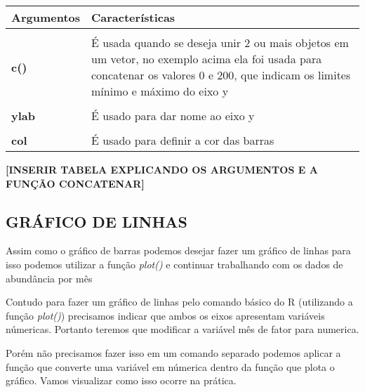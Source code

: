 \documentclass[]{book}
\newenvironment{Shaded}{\begin{snugshade}}{\end{snugshade}}
\newcommand{\DataTypeTok}[1]{\textcolor[rgb]{0.13,0.29,0.53}{#1}}
\newcommand{\KeywordTok}[1]{\textcolor[rgb]{0.13,0.29,0.53}{\textbf{#1}}}
\newcommand{\NormalTok}[1]{#1}
\newcommand{\OperatorTok}[1]{\textcolor[rgb]{0.81,0.36,0.00}{\textbf{#1}}}
\begin{document}
\begin{table}[H]
\centering
\begin{tabular}[t]{>{}l>{\raggedright\arraybackslash}p{30em}}
\toprule
Argumentos & Características\\
\midrule
\textbf{\cellcolor{gray!6}{ylim}} & \cellcolor{gray!6}{Refere-se aos limites do eixo y}\\
\textbf{c()} & É usada quando se deseja unir 2 ou mais objetos em um vetor, no exemplo acima ela foi usada para concatenar os valores 0 e 200, que indicam os limites mínimo e máximo do eixo y\\
\textbf{\cellcolor{gray!6}{xlab}} & \cellcolor{gray!6}{É usado para dar nome ao eixo x}\\
\textbf{ylab} & É usado para dar nome ao eixo y\\
\textbf{\cellcolor{gray!6}{names.arg}} & \cellcolor{gray!6}{É usado para definir o nome das categorias/barras representadas no eixo x, neste caso as categorias usadas estão vinculadas a coluna mes do objeto abundancia}\\
\addlinespace
\textbf{col} & É usado para definir a cor das barras\\
\bottomrule
\end{tabular}
\end{table}

\textbf{{[}INSERIR TABELA EXPLICANDO OS ARGUMENTOS E A FUNÇÃO CONCATENAR{]}}

\hypertarget{gruxe1fico-de-linhas}{%
\subsection{GRÁFICO DE LINHAS}\label{gruxe1fico-de-linhas}}

Assim como o gráfico de barras podemos desejar fazer um gráfico de linhas para isso podemos utilizar a função \emph{plot()} e continuar trabalhando com os dados de abundância por mês

Contudo para fazer um gráfico de linhas pelo comando básico do R (utilizando a função \emph{plot()}) precisamos indicar que ambos os eixos apresentam variáveis númericas. Portanto teremos que modificar a variável mês de fator para numerica.

Porém não precisamos fazer isso em um comando separado podemos aplicar a função que converte uma variável em númerica dentro da função que plota o gráfico. Vamos visualizar como isso ocorre na prática.

\begin{Shaded}
\end{Shaded}
\end{document}
